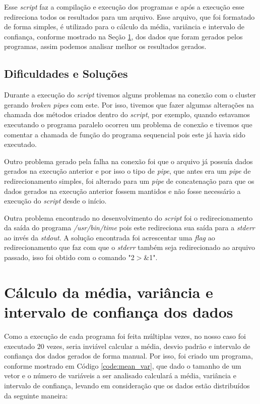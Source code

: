 \documentclass[11pt,twoside]{article}
\begin{document}
{{    Esse \textit{script} faz a compilação e execução dos programas e após a execução esse
    redireciona todos os resultados para um arquivo. Esse arquivo, que foi formatado de forma
    simples, é utilizado para o cálculo da média, variância e intervalo de confiança, conforme
    mostrado na Seção \ref{sec:mean_var}, dos dados que foram gerados pelos programas,
    assim podemos analisar melhor os resultados gerados.
    
    \subsection{Dificuldades e Soluções}

        Durante a execução do \textit{script} tivemos alguns problemas na conexão com o cluster
        gerando \textit{broken pipes} com este. Por isso, tivemos que fazer algumas alterações na
        chamada dos métodos criados dentro do \textit{script}, por exemplo, quando estavamos
        executando o programa paralelo ocorreu um problema de conexão e tivemos que comentar
        a chamada de função do programa sequencial pois este já havia sido executado.
        
        Outro problema gerado pela falha na conexão foi que o arquivo já possuía dados gerados
        na execução anterior e por isso o tipo de \textit{pipe}, que antes era um \textit{pipe}
        de redirecionamento simples, foi alterado para um \textit{pipe} de concatenação para que
        os dados gerados na execução anterior fossem mantidos e não fosse necessário a execução
        do \textit{script} desde o início.
        
        Outra problema encontrado no desenvolvimento do \textit{script} foi o redirecionamento
        da saída do programa \textit{/usr/bin/time} pois este redireciona sua saída para a
        \textit{stderr} ao invés da \textit{stdout}. A solução encontrada foi acrescentar
        uma \textit{flag} ao redirecionamento que faz com que o \textit{stderr} também seja redirecionado
        ao arquivo passado, isso foi obtido com o comando "2$>$\&1".
    

\section{Cálculo da média, variância e intervalo de confiança dos dados}
\label{sec:mean_var}

    Como a execução de cada programa foi feita múltiplas vezes, no nosso caso foi executado
    $20$ vezes, seria inviável calcular a média, desvio padrão e intervalo de confiança dos 
    dados gerados de forma manual. Por isso, foi criado um programa, conforme mostrado em
    Código \ref{code:mean_var}, que dado o tamanho de um vetor e o número de variáveis a
    ser analisado calculará a média, variância e intervalo de confiança, levando em 
    consideração que os dados estão distribuídos da seguinte maneira:
    
}}
\end{document}
